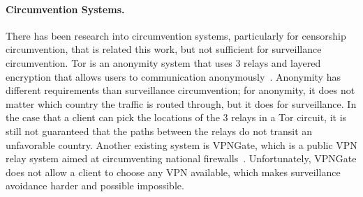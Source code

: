 \paragraph{Circumvention Systems.}  There has been research into circumvention systems, particularly for censorship circumvention, that is related this work, but not sufficient for surveillance circumvention.  Tor is an anonymity system that uses 3 relays and layered encryption that allows users to communication anonymously~\cite{dingledine2004tor}.  Anonymity has different requirements than surveillance circumvention; for anonymity, it does not matter which country the traffic is routed through, but it does for surveillance.  In the case that a client can pick the locations of the 3 relays in a Tor circuit, it is still not guaranteed that the paths between the relays do not transit an unfavorable country.  Another existing system is VPNGate, which is a public VPN relay system aimed at circumventing national firewalls~\cite{nobori2014vpn}.  Unfortunately, VPNGate does not allow a client to choose any VPN available, which makes surveillance avoidance harder and possible impossible.

